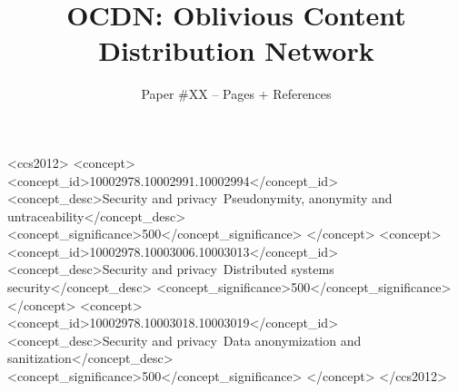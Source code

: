 \documentclass[sigconf]{acmart}
\begin{document}
\date{}
\title{OCDN: Oblivious Content Distribution Network}
\author{
{Paper \#XX -- \pageref{lastpage} Pages + References} \\
}



\begin{abstract}
\end{abstract}

\begin{CCSXML}
<ccs2012>
<concept>
<concept_id>10002978.10002991.10002994</concept_id>
<concept_desc>Security and privacy~Pseudonymity, anonymity and untraceability</concept_desc>
<concept_significance>500</concept_significance>
</concept>
<concept>
<concept_id>10002978.10003006.10003013</concept_id>
<concept_desc>Security and privacy~Distributed systems security</concept_desc>
<concept_significance>500</concept_significance>
</concept>
<concept>
<concept_id>10002978.10003018.10003019</concept_id>
<concept_desc>Security and privacy~Data anonymization and sanitization</concept_desc>
<concept_significance>500</concept_significance>
</concept>
</ccs2012>
\end{CCSXML}




\maketitle










\label{lastpage} 


\balance 
\end{document}
